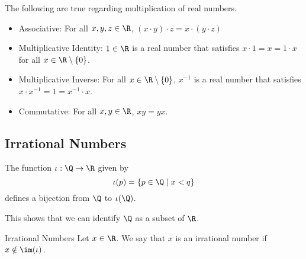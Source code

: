 \documentclass[a4paper]{article}
\begin{document}
\begin{prp}{}{} The following are true regarding multiplication of real numbers. 
\begin{itemize}
\item Associative: For all $x,y,z\in\R$, $(x\cdot y)\cdot z=x\cdot(y\cdot z)$
\item Multiplicative Identity: $1\in\R$ is a real number that satisfies $x\cdot 1=x=1\cdot x$ for all $x\in\R\setminus\{0\}$. 
\item Multiplicative Inverse: For all $x\in\R\setminus\{0\}$, $x^{-1}$ is a real number that satisfies $x\cdot x^{-1}=1=x^{-1}\cdot x$. 
\item Commutative: For all $x,y\in\R$, $xy=yx$. 
\end{itemize}
\end{prp}

\subsection{Irrational Numbers}
\begin{prp}{}{} The function $\iota:\Q\to\R$ given by $$\iota(p)=\{p\in\Q\;|\;x<q\}$$ defines a bijection from $\Q$ to $\iota(\Q)$. 
\end{prp}

This shows that we can identify $\Q$ as a subset of $\R$. 

\begin{defn}{Irrational Numbers}{} Let $x\in\R$. We say that $x$ is an irrational number if $x\notin\im(\iota)$. 
\end{defn}
\end{document}
